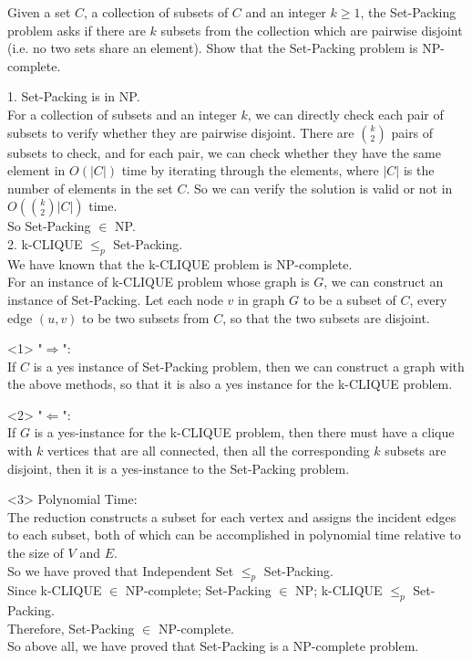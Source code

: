 \problem{}

Given a set $C$, a collection of subsets of $C$ and an integer $k \geq 1$, the Set-Packing problem asks if there are $k$ subsets from the collection which are pairwise disjoint (i.e. no two sets share an element). Show that the Set-Packing problem is NP-complete.

\solution{}

1. Set-Packing is in NP.\\
For a collection of subsets and an integer \( k \), we can directly check each pair of subsets to verify whether they are pairwise disjoint. There are \( \binom{k}{2} \) pairs of subsets to check, and for each pair, we can check whether they have the same element in $O(|C|)$ time by iterating through the elements, where $|C|$ is the number of elements in the set $C$. So we can verify the solution is valid or not in $O\left(\binom{k}{2}|C|\right)$ time.\\
So Set-Packing $\in$ NP.\\

2. k-CLIQUE $\leq_p$ Set-Packing.\\
We have known that the k-CLIQUE problem is NP-complete.\\
For an instance of k-CLIQUE problem whose graph is $G$, we can construct an instance of Set-Packing.
Let each node $v$ in graph $G$ to be a subset of $C$, every edge $(u,v)$ to be two subsets from $C$, so that the two subsets are disjoint.

<1> "$\Rightarrow$":\\
If $C$ is a yes instance of Set-Packing problem, then we can construct a graph with the above methods, so that it is also a yes instance for the k-CLIQUE problem.

<2> "$\Leftarrow$":\\
If $G$ is a yes-instance for the k-CLIQUE problem, then there must have a clique with $k$ vertices that are all connected, then all the corresponding $k$ subsets are disjoint, then it is a yes-instance to the Set-Packing problem.

<3> Polynomial Time:\\
The reduction constructs a subset for each vertex and assigns the incident edges to each subset, both of which can be accomplished in polynomial time relative to the size of \( V \) and \( E \).\\

So we have proved that Independent Set $\leq_p$ Set-Packing.\\

Since k-CLIQUE $\in$ NP-complete; Set-Packing $\in$ NP; k-CLIQUE $\leq_p$ Set-Packing.\\
Therefore, Set-Packing $\in$ NP-complete.\\

So above all, we have proved that Set-Packing is a NP-complete problem.

\newpage